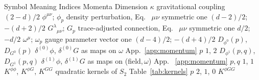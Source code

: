 \documentclass[prd,aps,preprint,superscriptaddress,nofootinbib,amsmath,amssymb,eqsecnum]{revtex4-2}
\providecommand{\DIFdeltex}[1]{{\protect\color{red} \scriptsize #1}} %
\providecommand{\DIFdelbegin}{} %
\providecommand{\DIFdelFL}[1]{\DIFdel{#1}} %
\providecommand{\DIFdel}[1]{\texorpdfstring{\DIFdeltex{#1}}{}} %
\begin{document}
\DIFdelbegin %
\DIFdelFL{Symbol }%
\DIFdelFL{Meaning }%
\DIFdelFL{Indices }%
\DIFdelFL{Momenta }%
\DIFdelFL{Dimension }%
\DIFdelFL{$\kappa$ }%
\DIFdelFL{gravitational coupling }%
\DIFdelFL{$(2-d)/2$ }%
\DIFdelFL{$\phi^{\mu\nu}$; $\phi_p$ }%
\DIFdelFL{density perturbation, Eq.~}%
\DIFdelFL{$\mu\nu$ symmetric }%
\DIFdelFL{one }%
\DIFdelFL{$(d-2)/2$; $-(d+2)/2$ }%
\DIFdelFL{$G^{\lambda}{}_{\mu\nu}$; $G_p$ }%
\DIFdelFL{trace-adjusted connection, Eq.~}%
\DIFdelFL{$\mu\nu$ symmetric }%
\DIFdelFL{one }%
\DIFdelFL{$d/2$; $-d/2$ }%
\DIFdelFL{$\omega^{\mu}$; $\omega_p$ }%
\DIFdelFL{gauge parameter }%
\DIFdelFL{vector }%
\DIFdelFL{one }%
\DIFdelFL{$(d-4)/2$; $-(d+4)/2$ }%
\DIFdelFL{$D_{\phi^0}(p)$, $D_{G^0}(p)$ }%
\DIFdelFL{$\delta^{(0)}\phi$, $\delta^{(0)}G$ as maps on $\omega$ }%
\DIFdelFL{App.~\ref{app:momentum}}%
\DIFdelFL{$p$ }%
\DIFdelFL{$1$, $2$ }%
\DIFdelFL{$D_{\phi^1}(p,q)$, $D_{G^1}(p,q)$ }%
\DIFdelFL{$\delta^{(1)}\phi$, $\delta^{(1)}G$ as maps on (field,\,$\omega$)}%
\DIFdelFL{App.
~\ref{app:momentum} }%
\DIFdelFL{$p,q$ }%
\DIFdelFL{$1$, $1$ }%
\DIFdelFL{$K^{\phi\phi}$, $K^{\phi G}$, $K^{GG}$ }%
\DIFdelFL{quadratic kernels of $S_2$ }%
\DIFdelFL{Table~\ref{tab:kernels} }%
\DIFdelFL{$p$ }%
\DIFdelFL{$2$, $1$, $0$ }%
\DIFdelFL{$K^{\phi GG}$ }%
\end{document}
